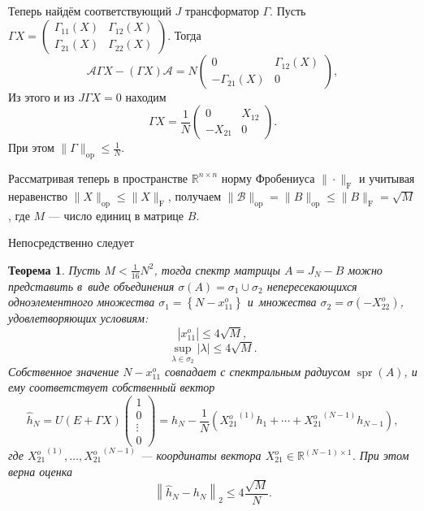 \documentclass[12pt]{article}
\newtheorem{ksvthm}{Теорема}
\theoremstyle{definition}
\begin{document}
Теперь найдём соответствующий \( J \)
    трансформатор \( \Gamma \).
Пусть \( \Gamma X = \begin{pmatrix}
    \Gamma_{11}(X) & \Gamma_{12}(X) \\
    \Gamma_{21}(X) & \Gamma_{22}(X)
\end{pmatrix} \).
Тогда
\[
    \mathcal{A} \Gamma X - (\Gamma X)\mathcal{A} =
    N
    \begin{pmatrix}
        0 & \Gamma_{12}(X) \\
        -\Gamma_{21}(X) & 0
     \end{pmatrix},
     \]
Из этого и из \( J\Gamma X = 0 \) находим
    \[
        \Gamma X = \frac{1}{N} \begin{pmatrix} 0 & X_{12} \\ -X_{21} & 0 \end{pmatrix}.
        \]
При этом
    \(
        \|\Gamma\|_{\mathrm{op}} \leq \frac1N.
        \)

Рассматривая теперь в пространстве \( \mathbb{R}^{n{\times}n} \)
    норму Фробениуса \( \|\cdot\|_{\mathrm{F}} \)
    и учитывая неравенство \( \|X\|_{\mathrm{op}} \leq \|X\|_{\mathrm{F}} \),
    получаем \( \|\mathcal{B}\|_{\mathrm{op}} =
        \|B\|_{\mathrm{op}} \leq \|B\|_{\mathrm{F}} = \sqrt{M} \),
    где \( M \) --- число единиц в матрице \( B \).

Непосредственно следует
\begin{ksvthm}\label{kozlukovsv:thm:almost-all-ones}
    Пусть \( M < \frac{1}{16}N^2 \),
        тогда спектр матрицы \( A = J_N{-}B \) можно представить в~виде
        объединения \( \sigma\left(A\right) = \sigma_1 \cup \sigma_2 \)
        непересекающихся
        одноэлементного множества \( {\sigma_1 = \left\{ N{-}x_{11}^o \right\}} \)
        и~множества \( \sigma_2=\sigma(-X_{22}^o) \), удовлетворяющих условиям:
    \[
        |x_{11}^o| \leq 4\sqrt{M},
        \]
    \[
        \sup_{\lambda\in\sigma_2} |\lambda| \leq 4\sqrt{M}.
        \]
    Собственное значение \( N - x_{11}^o \) совпадает с спектральным радиусом
        \( \operatorname{spr}(A) \),
        и ему соответствует собственный вектор
        \[
            \hat{h}_N =
            U(E+\Gamma X)\begin{pmatrix}1\\0\\ {\vdots}\\ 0\end{pmatrix} =
            h_N -
            \frac1N (
                {X_{21}^o}^{(1)} h_1 +
                \cdots +
                {X_{21}^o}^{(N-1)} h_{N-1}),
            \]
        где \( {X_{21}^o}^{(1)}, \ldots, {X_{21}^o}^{(N-1)} \)
        --- координаты вектора \( X_{21}^o\in\mathbb{R}^{(N{-}1){\times}1} \).
    При этом верна оценка
    \[
        \left\|\hat{h}_N - h_N \right\|_2 \leq 4\frac{\sqrt{M}}{N}.
        \]
\end{ksvthm}
\end{document}
